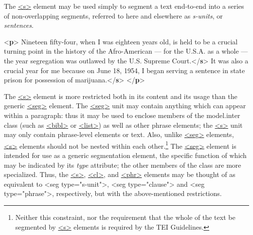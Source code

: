 The \hyperref[TEI.s]{<s>} element may be used simply to segment a text end-to-end into a series of non-overlapping segments, referred to here and elsewhere as \textit{s-units}, or \textit{sentences}. \par\bgroup{}\exampleFont \begin{shaded}\noindent\mbox{}{<\textbf{p}>}\mbox{}\newline 
{}Nineteen fifty-four, when I was eighteen years old,\mbox{}\newline 
\hspace*{1em}\hspace*{1em} is held to be a crucial turning point in the history of\mbox{}\newline 
\hspace*{1em}\hspace*{1em} the Afro-American — for the U.S.A. as a whole — the\mbox{}\newline 
\hspace*{1em}\hspace*{1em} year segregation was outlawed by the U.S. Supreme Court.{</\textbf{s}>}\mbox{}\newline 
{}It was also a crucial year for me because on June 18,\mbox{}\newline 
\hspace*{1em}\hspace*{1em} 1954, I began serving a sentence in state prison for\mbox{}\newline 
\hspace*{1em}\hspace*{1em} possession of marijuana.{</\textbf{s}>}\mbox{}\newline 
{</\textbf{p}>}\end{shaded}\egroup\par \noindent  The \hyperref[TEI.s]{<s>} element is more restricted both in its content and its usage than the generic \hyperref[TEI.seg]{<seg>} element. The \hyperref[TEI.seg]{<seg>} unit may contain anything which can appear within a paragraph: thus it may be used to enclose members of the \textsf{model.inter} class (such as \hyperref[TEI.bibl]{<bibl>} or \hyperref[TEI.list]{<list>}) as well as other phrase elements; the \hyperref[TEI.s]{<s>} unit may only contain phrase-level elements or text. Also, unlike \hyperref[TEI.seg]{<seg>} elements, \hyperref[TEI.s]{<s>} elements should not be nested within each other.\footnote{Neither this constraint, nor the requirement that the whole of the text be segmented by \hyperref[TEI.s]{<s>} elements is required by the TEI Guidelines.} The \hyperref[TEI.seg]{<seg>} element is intended for use as a generic segmentation element, the specific function of which may be indicated by its {\itshape type} attribute; the other members of the class are more specialized. Thus, the \hyperref[TEI.s]{<s>}, \hyperref[TEI.cl]{<cl>}, and \hyperref[TEI.phr]{<phr>} elements may be thought of as equivalent to <seg type="s-unit">, <seg type="clause"> and <seg type="phrase">, respectively, but with the above-mentioned restrictions.\par
